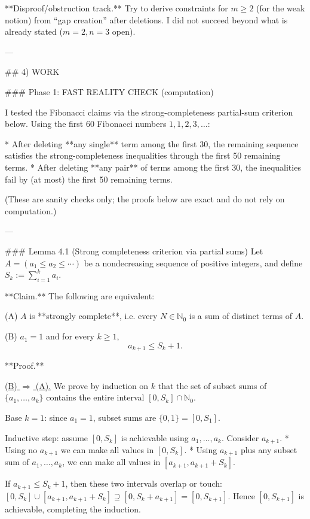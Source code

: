 **Disproof/obstruction track.**
Try to derive constraints for \(m\ge 2\) (for the weak notion) from “gap creation” after deletions.
I did not succeed beyond what is already stated (\(m=2,n=3\) open).

---

## 4) WORK

### Phase 1: FAST REALITY CHECK (computation)

I tested the Fibonacci claims via the strong-completeness partial-sum criterion below.
Using the first 60 Fibonacci numbers \(1,1,2,3,\dots\):

* After deleting **any single** term among the first 30, the remaining sequence satisfies the
  strong-completeness inequalities through the first 50 remaining terms.
* After deleting **any pair** of terms among the first 30, the inequalities fail by (at most) the
  first 50 remaining terms.

(These are sanity checks only; the proofs below are exact and do not rely on computation.)

---

### Lemma 4.1 (Strong completeness criterion via partial sums)
Let \(A=(a_1\le a_2\le\cdots)\) be a nondecreasing sequence of positive integers, and define
\(S_k:=\sum_{i=1}^k a_i\).

**Claim.** The following are equivalent:

(A) \(A\) is **strongly complete**, i.e. every \(N\in\mathbb N_0\) is a sum of distinct terms of \(A\).

(B) \(a_1=1\) and for every \(k\ge 1\),
\[
 a_{k+1}\le S_k+1.
\]

**Proof.**

\underline{(B) \(\Rightarrow\) (A).}
We prove by induction on \(k\) that the set of subset sums of \(\{a_1,\dots,a_k\}\) contains the entire
interval \([0,S_k]\cap\mathbb N_0\).

Base \(k=1\): since \(a_1=1\), subset sums are \(\{0,1\}=[0,S_1]\).

Inductive step: assume \([0,S_k]\) is achievable using \(a_1,\dots,a_k\). Consider \(a_{k+1}\).
* Using no \(a_{k+1}\) we can make all values in \([0,S_k]\).
* Using \(a_{k+1}\) plus any subset sum of \(a_1,\dots,a_k\), we can make all values in
  \([a_{k+1}, a_{k+1}+S_k]\).

If \(a_{k+1}\le S_k+1\), then these two intervals overlap or touch:
\([0,S_k]\cup[a_{k+1},a_{k+1}+S_k]\supseteq [0,S_k+a_{k+1}]=[0,S_{k+1}]\).
Hence \([0,S_{k+1}]\) is achievable, completing the induction.

